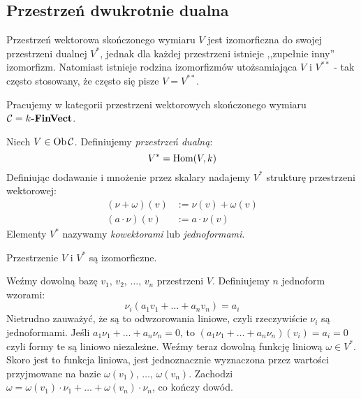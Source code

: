 \subsection{\starred Przestrzeń dwukrotnie dualna}
{
\newcommand{\dual}[1]{{#1}^{*}}
\newcommand{\ddual}[1]{{#1}^{**}}

\begin{idea}
  Przestrzeń wektorowa skończonego wymiaru $V$ jest izomorficzna do swojej przestrzeni dualnej $\dual V$, jednak dla każdej przestrzeni istnieje ,,zupełnie inny'' izomorfizm. Natomiast istnieje rodzina izomorfizmów utożsamiająca $V$ i $\ddual V$ - tak często stosowany, że często się pisze $V=\ddual V$.
\end{idea}

\begin{nott}
  Pracujemy w kategorii przestrzeni wektorowych skończonego wymiaru $\mathcal C=k\textbf{-FinVect}$.
\end{nott}

\begin{defn}
  Niech $V\in \textrm{Ob\,}{\mathcal C}$. Definiujemy \emph{przestrzeń dualną}:
    $$\dual V = \Mor Vk$$
  Definiując dodawanie i mnożenie przez skalary nadajemy $\dual V$ strukturę przestrzeni wektorowej:
  \begin{align*}
    (\nu+\omega)(v) &:= \nu(v) + \omega(v)\\
    (a\cdot \nu)(v) &:= a\cdot \nu(v)
  \end{align*}
  Elementy $\dual V$ nazywamy \emph{kowektorami} lub \emph{jednoformami}.
\end{defn}

\begin{thm}
  Przestrzenie $V$ i $\dual V$ są izomorficzne.
\end{thm}

\begin{prof}
  Weźmy dowolną bazę $v_1,\, v_2,\, \dots,\, v_n$ przestrzeni $V$. Definiujemy $n$ jednoform wzorami:
  $$\nu_i(a_1v_1 + \dots + a_nv_n) = a_i$$
  Nietrudno zauważyć, że są to odwzorowania liniowe, czyli rzeczywiście $\nu_i$ są jednoformami. Jeśli $a_1\nu_1+\dots + a_n\nu_n=0$, to $(a_1\nu_1+\dots + a_n\nu_n)(v_i)=a_i=0$ czyli formy te są liniowo niezależne.
  Weźmy teraz dowolną funkcję liniową $\omega\in \dual V$. Skoro jest to funkcja liniowa, jest jednoznacznie wyznaczona przez wartości przyjmowane na bazie $\omega(v_1),\,\dots,\,\omega(v_n)$. Zachodzi $\omega = \omega(v_1)\cdot \nu_1+\dots+\omega(v_n)\cdot \nu_n$, co kończy dowód.
\end{prof}

}
